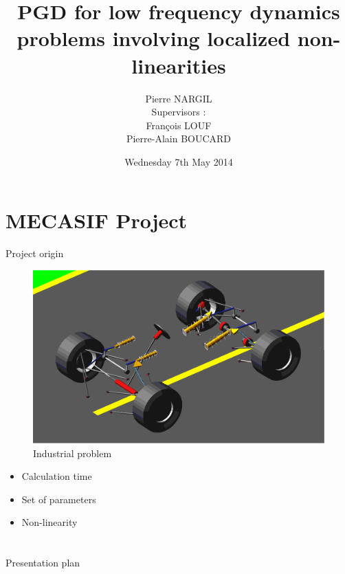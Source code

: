 \documentclass[10pt,a4paper]{beamer}
\title[IRTG Presentation]{PGD for low frequency dynamics problems involving localized non-linearities}
\author[Pierre NARGIL]{Pierre NARGIL\\Supervisors : 
\large{\\François LOUF\\Pierre-Alain BOUCARD} }
\institute{LMT Cachan}
\date{Wednesday 7th May 2014}
\begin{document}
\begin{frame}
	\titlepage
\end{frame}

\section{MECASIF Project}

\begin{frame}{Project origin}
	\vspace{-0.3cm}
	\begin{center}
		\begin{figure}
		\begin{minipage}{0.70\linewidth}
				\includegraphics[width=1\linewidth]{roulage.eps}
				\caption{Industrial problem}
			\end{minipage}
		\end{figure}
	\end{center}
	\vspace{-0.5cm}
	\begin{itemize}
		\item Calculation time
		\item Set of parameters
		\item Non-linearity
	\end{itemize}
\end{frame}

\section*{}

\begin{frame}{Presentation plan}
	\begin{block}{}
			\hspace{1cm}
			\begin{minipage}[l][0.650\textheight]{0.30\linewidth}
				\setcounter{tocdepth}{2}
				\tableofcontents
			\end{minipage}
			\vspace{0.5cm}
	\end{block}
\end{frame}
\end{document}
